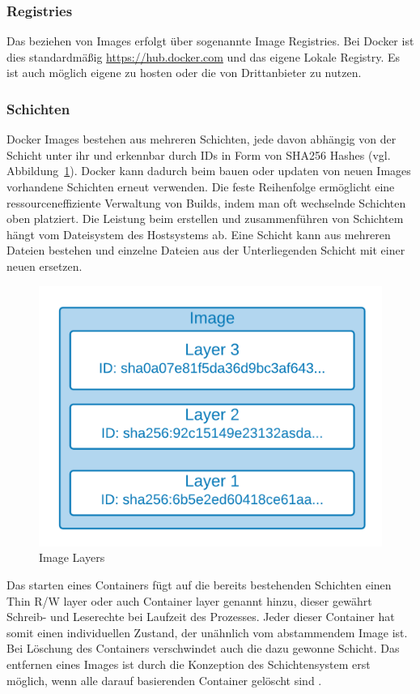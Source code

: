 \subsubsection{Registries}
Das beziehen von Images erfolgt über sogenannte \glqq Image Registries\grqq{}.
Bei Docker ist dies standardmäßig \url{https://hub.docker.com} und das eigene Lokale Registry. 
Es ist auch möglich eigene zu hosten oder die von Drittanbieter zu nutzen.

\subsubsection{Schichten}
Docker Images bestehen aus mehreren Schichten, jede davon abhängig von der Schicht unter ihr und
erkennbar durch IDs in Form von SHA256 Hashes (vgl. Abbildung~\ref{fig:dockerlayer}).
Docker kann dadurch beim bauen oder updaten von neuen Images vorhandene Schichten erneut verwenden. 
Die feste Reihenfolge ermöglicht eine ressourceneffiziente Verwaltung von Builds,
indem man oft wechselnde Schichten oben platziert. 
Die Leistung beim erstellen und zusammenführen von Schichtem hängt vom Dateisystem des Hostsystems ab.
Eine Schicht kann aus mehreren Dateien bestehen
und einzelne Dateien aus der Unterliegenden Schicht mit einer neuen ersetzen.

\begin{figure}
    \centering
    \includegraphics[width=0.5\columnwidth]{images/Image-Layer.png}
    \caption{Image Layers \protect}
    \label{fig:dockerlayer}
\end{figure}


Das starten eines Containers fügt auf die bereits bestehenden Schichten einen \glqq Thin R/W layer\grqq{} 
oder auch \glqq Container layer\grqq{} genannt hinzu, dieser gewährt Schreib- und Leserechte bei Laufzeit des Prozesses. 
Jeder dieser Container hat somit einen individuellen Zustand, der unähnlich vom abstammendem Image ist.
Bei Löschung des Containers verschwindet auch die dazu gewonne Schicht.
Das entfernen eines Images ist durch die Konzeption des Schichtensystem erst möglich, wenn alle darauf
basierenden Container gelöscht sind \cite{dockerstoragedriver}.

